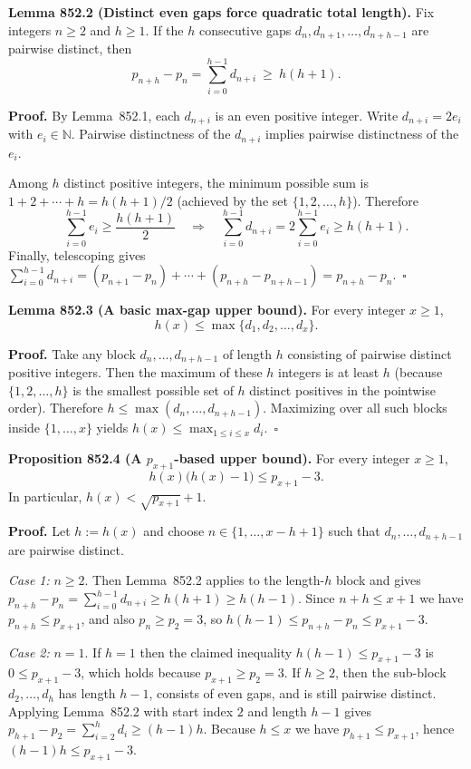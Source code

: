 \medskip
\textbf{Lemma 852.2 (Distinct even gaps force quadratic total length).}
Fix integers $n\ge 2$ and $h\ge 1$. If the $h$ consecutive gaps $d_n,d_{n+1},\dots,d_{n+h-1}$ are pairwise distinct, then
\[
  p_{n+h}-p_n = \sum_{i=0}^{h-1} d_{n+i} \ \ge\ h(h+1).
\]

\textbf{Proof.}
By Lemma~852.1, each $d_{n+i}$ is an even positive integer. Write $d_{n+i}=2e_i$ with $e_i\in\mathbb{N}$. Pairwise distinctness of the $d_{n+i}$ implies pairwise distinctness of the $e_i$.

Among $h$ distinct positive integers, the minimum possible sum is $1+2+\cdots+h = h(h+1)/2$ (achieved by the set $\{1,2,\dots,h\}$). Therefore
\[
  \sum_{i=0}^{h-1} e_i \ge \frac{h(h+1)}{2}
  \quad\Rightarrow\quad
  \sum_{i=0}^{h-1} d_{n+i} = 2\sum_{i=0}^{h-1} e_i \ge h(h+1).
\]
Finally, telescoping gives $\sum_{i=0}^{h-1} d_{n+i} = (p_{n+1}-p_n)+\cdots+(p_{n+h}-p_{n+h-1})=p_{n+h}-p_n$.\ $\square$

\medskip
\textbf{Lemma 852.3 (A basic max-gap upper bound).}
For every integer $x\ge 1$,
\[
  h(x) \le \max\{d_1,d_2,\dots,d_x\}.
\]

\textbf{Proof.}
Take any block $d_n,\dots,d_{n+h-1}$ of length $h$ consisting of pairwise distinct positive integers. Then the maximum of these $h$ integers is at least $h$ (because $\{1,2,\dots,h\}$ is the smallest possible set of $h$ distinct positives in the pointwise order). Therefore $h\le \max(d_n,\dots,d_{n+h-1})$. Maximizing over all such blocks inside $\{1,\dots,x\}$ yields $h(x)\le \max_{1\le i\le x} d_i$.\ $\square$

\medskip
\textbf{Proposition 852.4 (A $p_{x+1}$-based upper bound).}
For every integer $x\ge 1$,
\[
  h(x)\bigl(h(x)-1\bigr) \le p_{x+1}-3.
\]
In particular, $h(x) < \sqrt{p_{x+1}}+1$.

\textbf{Proof.}
Let $h:=h(x)$ and choose $n\in\{1,\dots,x-h+1\}$ such that $d_n,\dots,d_{n+h-1}$ are pairwise distinct.

\emph{Case 1:} $n\ge 2$. Then Lemma~852.2 applies to the length-$h$ block and gives
$p_{n+h}-p_n=\sum_{i=0}^{h-1} d_{n+i}\ge h(h+1)\ge h(h-1)$. Since $n+h\le x+1$ we have $p_{n+h}\le p_{x+1}$, and also $p_n\ge p_2=3$, so
$h(h-1)\le p_{n+h}-p_n \le p_{x+1}-3$.

\emph{Case 2:} $n=1$. If $h=1$ then the claimed inequality $h(h-1)\le p_{x+1}-3$ is $0\le p_{x+1}-3$, which holds because $p_{x+1}\ge p_2=3$. If $h\ge 2$, then the sub-block $d_2,\dots,d_h$ has length $h-1$, consists of even gaps, and is still pairwise distinct. Applying Lemma~852.2 with start index $2$ and length $h-1$ gives
$p_{h+1}-p_2=\sum_{i=2}^{h} d_i\ge (h-1)h$. Because $h\le x$ we have $p_{h+1}\le p_{x+1}$, hence $(h-1)h\le p_{x+1}-3$.

